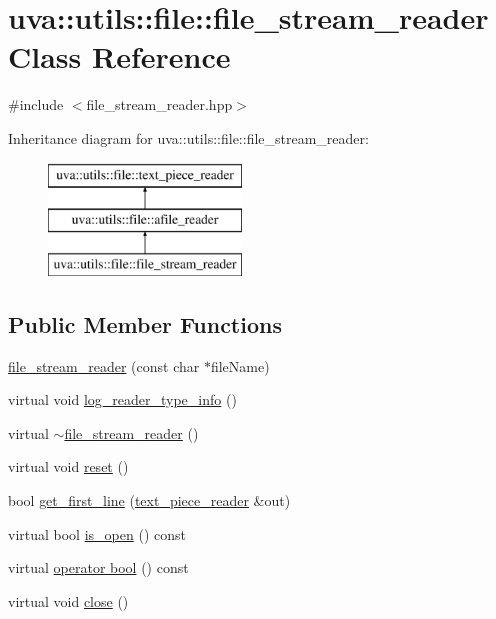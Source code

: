\hypertarget{classuva_1_1utils_1_1file_1_1file__stream__reader}{}\section{uva\+:\+:utils\+:\+:file\+:\+:file\+\_\+stream\+\_\+reader Class Reference}
\label{classuva_1_1utils_1_1file_1_1file__stream__reader}


{\ttfamily \#include $<$file\+\_\+stream\+\_\+reader.\+hpp$>$}

Inheritance diagram for uva\+:\+:utils\+:\+:file\+:\+:file\+\_\+stream\+\_\+reader\+:\begin{figure}[H]
\begin{center}
\leavevmode
\includegraphics[height=3.000000cm]{classuva_1_1utils_1_1file_1_1file__stream__reader}
\end{center}
\end{figure}
\subsection*{Public Member Functions}
\begin{DoxyCompactItemize}
\item 
\hyperlink{classuva_1_1utils_1_1file_1_1file__stream__reader_aef4d8e8a6a2cf950cdad90a0d9111ad5}{file\+\_\+stream\+\_\+reader} (const char $\ast$file\+Name)
\item 
virtual void \hyperlink{classuva_1_1utils_1_1file_1_1file__stream__reader_ab0e086617a0120dd3ecb65c7f7c75216}{log\+\_\+reader\+\_\+type\+\_\+info} ()
\item 
virtual \hyperlink{classuva_1_1utils_1_1file_1_1file__stream__reader_a915fd780b43b5e53cde638908afe4599}{$\sim$file\+\_\+stream\+\_\+reader} ()
\item 
virtual void \hyperlink{classuva_1_1utils_1_1file_1_1file__stream__reader_a3a579315992389d23a76693a4d047dc9}{reset} ()
\item 
bool \hyperlink{classuva_1_1utils_1_1file_1_1file__stream__reader_a7da3e8780a7c34188ae8826ba3197073}{get\+\_\+first\+\_\+line} (\hyperlink{classuva_1_1utils_1_1file_1_1text__piece__reader}{text\+\_\+piece\+\_\+reader} \&out)
\item 
virtual bool \hyperlink{classuva_1_1utils_1_1file_1_1file__stream__reader_ae6d49ac163dce81f0abb5f9336068ed0}{is\+\_\+open} () const 
\item 
virtual \hyperlink{classuva_1_1utils_1_1file_1_1file__stream__reader_a46864e4d87226c5ed998fbc1d8cafd94}{operator bool} () const 
\item 
virtual void \hyperlink{classuva_1_1utils_1_1file_1_1file__stream__reader_a3a9e53befe8287be321e036c6848177b}{close} ()
\end{DoxyCompactItemize}
